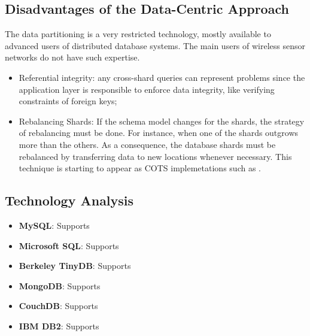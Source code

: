 
\subsection{Disadvantages of the Data-Centric Approach}

The data partitioning is a very restricted technology, mostly available to
advanced users of distributed database systems. The main users of wireless
sensor networks do not have such expertise.

\begin{itemize}
  \item Referential integrity: any cross-shard queries can represent problems 
  since the application layer is responsible to enforce data integrity, like
  verifying constraints of foreign keys;
  \item Rebalancing Shards: If the schema model changes for the shards, the
  strategy of rebalancing must be done. For instance, when one of the shards 
  outgrows more than the others. As a consequence, the database shards must be
  rebalanced by transferring data to new locations whenever necessary. This
  technique is starting to appear as COTS implemetations such as
  \cite{mongodb}.
\end{itemize}

\subsection{Technology Analysis}

\begin{itemize}
  \item \textbf{MySQL}: Supports
  \item \textbf{Microsoft SQL}: Supports
  \item \textbf{Berkeley TinyDB}: Supports
  \item \textbf{MongoDB}: Supports
  \item \textbf{CouchDB}: Supports
  \item \textbf{IBM DB2}: Supports
\end{itemize}

